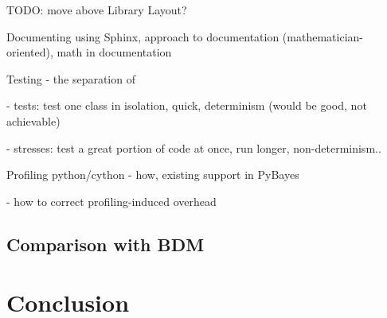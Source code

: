 \documentclass[a4paper,12pt,oneside]{report}
\newif\ifrelease %
\begin{document}
TODO: move above Library Layout?

Documenting using Sphinx, approach to documentation (mathematician-oriented), math in documentation

Testing - the separation of

- tests: test one class in isolation, quick, determinism (would be good, not achievable)

- stresses: test a great portion of code at once, run longer, non-determinism..

Profiling python/cython - how, existing support in PyBayes

- how to correct profiling-induced overhead

\section{Comparison with BDM}


\chapter*{Conclusion} 


\clearpage %



\ifrelease
	\appendix %
	\clearpage %
	\phantomsection %
	\addcontentsline{toc}{chapter}{\appendixname}

	\part*{\appendixname}

	
\fi
\end{document}
